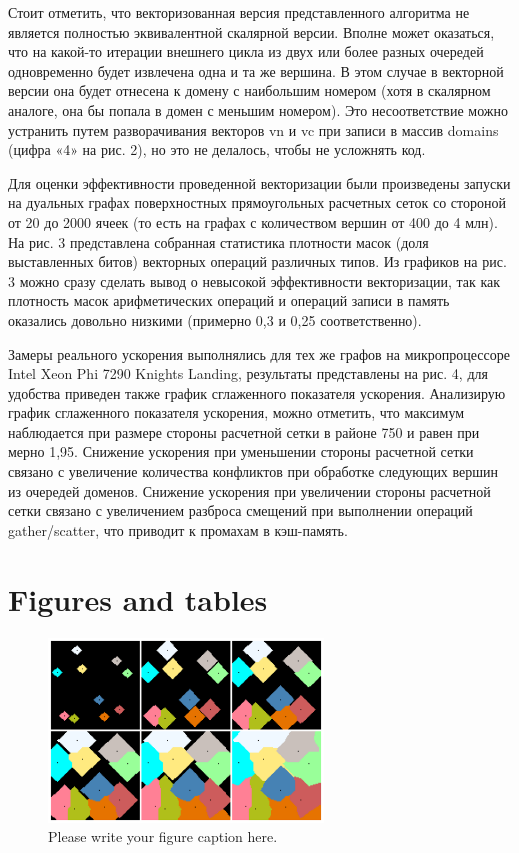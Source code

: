 \documentclass[
11pt,%
tightenlines,%
twoside,%
onecolumn,%
nofloats,%
nobibnotes,%
nofootinbib,%
superscriptaddress,%
noshowpacs,%
centertags]%
{revtex4}
\begin{document}
Стоит отметить, что векторизованная версия представленного алгоритма не является полностью эквивалентной скалярной версии.
Вполне может оказаться, что на какой-то итерации внешнего цикла из двух или более разных очередей одновременно будет извлечена одна и та же вершина.
В этом случае в векторной версии она будет отнесена к домену с наибольшим номером (хотя в скалярном аналоге, она бы попала в домен с меньшим номером).
Это несоответствие можно устранить путем разворачивания векторов vn и vc при записи в массив domains (цифра «4» на рис. 2), но это не делалось, чтобы не усложнять код.

Для оценки эффективности проведенной векторизации были произведены запуски на дуальных графах поверхностных прямоугольных расчетных сеток со стороной от 20 до 2000 ячеек (то есть на графах с количеством вершин от 400 до 4 млн).
На рис. 3 представлена собранная статистика плотности масок (доля выставленных битов) векторных операций различных типов.
Из графиков на рис. 3 можно сразу сделать вывод о невысокой эффективности векторизации, так как плотность масок арифметических операций и операций записи в память оказались довольно низкими (примерно 0,3 и 0,25 соответственно).

Замеры реального ускорения выполнялись для тех же графов на микропроцессоре Intel Xeon Phi 7290 Knights Landing, результаты представлены на рис. 4, для удобства приведен также график сглаженного показателя ускорения.
Анализирую график сглаженного показателя ускорения, можно отметить, что максимум наблюдается при размере стороны расчетной сетки в районе 750 и равен при мерно 1,95.
Снижение ускорения при уменьшении стороны расчетной сетки связано с увеличение количества конфликтов при обработке следующих вершин из очередей доменов.
Снижение ускорения при увеличении стороны расчетной сетки связано с увеличением разброса смещений при выполнении операций gather/scatter, что приводит к промахам в кэш-память.

\section{Figures and tables}

\begin{figure}[h]
\setcaptionmargin{5mm}
\onelinecaptionstrue  %
\includegraphics[width=0.65\textwidth]{pics/incr.pdf}
\caption{Please write your figure caption here.}\label{fig:incr}
\end{figure}
\end{document}
